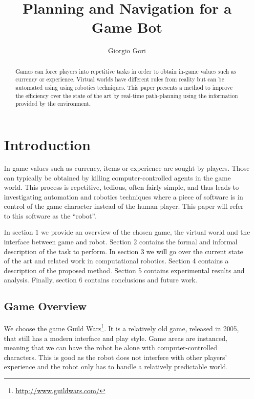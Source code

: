 \documentclass[]{article}
\title{Planning and Navigation for a Game Bot}
\author{Giorgio Gori}
\begin{document}
\maketitle

\begin{abstract}
    Games can force players into repetitive tasks in order to obtain in-game values such as currency or experience. Virtual worlds have different rules from reality but can be automated using using robotics techniques. This paper presents a method to improve the efficiency over the state of the art by real-time path-planning using the information provided by the environment.
\end{abstract}

\section{Introduction}
In-game values such as currency, items or experience are sought by players. Those can typically be obtained by killing computer-controlled agents in the game world. This process is repetitive, tedious, often fairly simple, and thus leads to investigating automation and robotics techniques where a piece of software is in control of the game character instead of the human player. This paper will refer to this software as the ``robot''.

In section 1 we provide an overview of the chosen game, the virtual world and the interface between game and robot. Section 2 contains the formal and informal description of the task to perform. In section 3 we will go over the current state of the art and related work in computational robotics. Section 4 contains a description of the proposed method. Section 5 contains experimental results and analysis. Finally, section 6 contains conclusions and future work.

\subsection{Game Overview}
We choose the game Guild Wars\footnote{\url{http://www.guildwars.com/}}. It is a relatively old game, released in 2005, that still has a modern interface and play style. Game areas are instanced, meaning that we can have the robot be alone with computer-controlled characters. This is good as the robot does not interfere with other players' experience and the robot only has to handle a relatively predictable world.
\end{document}
